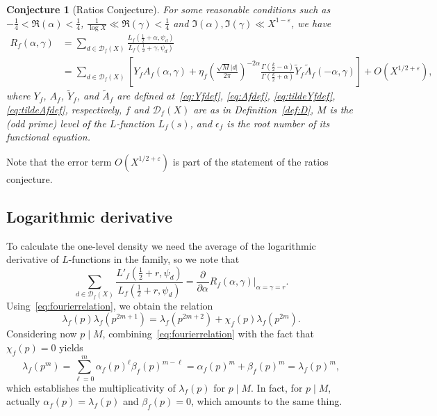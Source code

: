 \documentclass[11pt,reqno]{amsart} \usepackage{fullpage}
\newtheorem{conjecture}{Conjecture}
\newcommand{\ep}{\epsilon}
\newcommand{\vep}{\varepsilon}
\newcommand{\pp}[2][]{\frac{\partial^{#1}}{\partial {#2}^{#1}}}
\newcommand\be{\begin{equation}}
\newcommand\ee{\end{equation}}
\newcommand{\D}{\mathcal D_f}
\numberwithin{equation}{section}
\begin{document}
\begin{conjecture}[Ratios Conjecture]\label{conj:ratios}
  For some reasonable conditions such as $-\frac14<\Re(\alpha)<\frac14$,
  $\frac1{\log X}\ll\Re(\gamma)<\frac14$ and $\Im(\alpha),\Im(\gamma)\ll X^{1-\vep}$,
  we have
  \be\begin{aligned}
    R_f(\alpha,\gamma)&=
    \sum_{d\in\D(X)}
    \frac{L_f\left(\frac12+\alpha,\psi_d\right)}{L_f\left(\frac12+\gamma,\psi_d\right)} \\
    &=\sum_{d\in\D(X)}
    \left[Y_fA_f(\alpha,\gamma)+
      \eta_f\left(\frac{\sqrt M |d|}{2\pi}\right)^{-2\alpha}
      \frac{\Gamma\left(\frac k2-\alpha\right)}{\Gamma\left(\frac k2+\alpha\right)}
      \tilde{Y}_f\tilde{A}_f(-\alpha,\gamma)\right]
    +O\left(X^{1/2+\vep}\right),
  \end{aligned}\ee
  where $Y_f$, $A_f$, $\tilde Y_f$, and $\tilde A_f$ are defined
  at~\eqref{eq:Yfdef}, \eqref{eq:Afdef}, \eqref{eq:tildeYfdef},
  \eqref{eq:tildeAfdef}, respectively, $f$ and $\D(X)$ are as in Definition~\ref{def:D},
  $M$ is the (odd prime) level of the $L$-function $L_f(s)$, and $\ep_f$ is the root number
  of its functional equation.
\end{conjecture}
Note that the error term $O\left(X^{1/2+\vep}\right)$ is part of the statement of
the ratios conjecture.
\subsection{Logarithmic derivative}
To calculate the one-level density we need the average of the logarithmic
derivative of $L$-functions in the family, so we note that
\be \sum_{d\in\D(X)}
\frac{L'_f\left(\frac12+r,\psi_d\right)}{L_f\left(\frac12+r,\psi_d\right)}
=\pp\alpha\left.R_f(\alpha,\gamma)\right|_{\alpha=\gamma=r}. \ee
Using~\eqref{eq:fourierrelation}, we obtain the relation
\be\label{eq:fouriercombo} \lambda_f(p)\lambda_f(p^{2m+1})
=\lambda_f(p^{2m+2})+\chi_f(p)\lambda_f(p^{2m}). \ee
Considering now $p\mid M$, combining~\eqref{eq:fourierrelation} with the fact
that $\chi_f(p)=0$ yields
\be\label{eq:fouriermultiplicativity}
\lambda_f(p^m)=\sum_{\ell=0}^m \alpha_f(p)^\ell \beta_f(p)^{m-\ell}
= \alpha_f(p)^m + \beta_f(p)^m = \lambda_f(p)^m, \ee
which establishes the multiplicativity of $\lambda_f(p)$ for $p\mid M$.
In fact, for $p\mid M$, actually $\alpha_f(p)=\lambda_f(p)$ and $\beta_f(p)=0$, which
amounts to the same thing.
\end{document}
